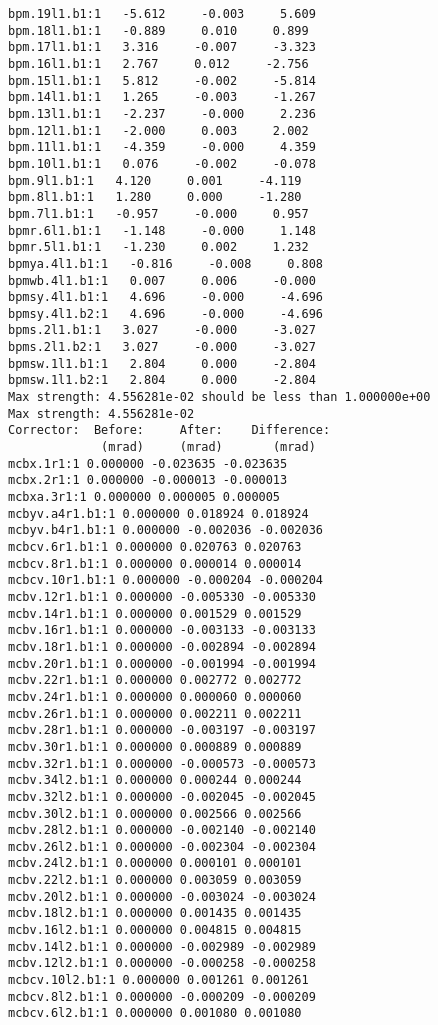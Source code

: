 \begin{verbatim}
bpm.19l1.b1:1   -5.612     -0.003     5.609
bpm.18l1.b1:1   -0.889     0.010     0.899
bpm.17l1.b1:1   3.316     -0.007     -3.323
bpm.16l1.b1:1   2.767     0.012     -2.756
bpm.15l1.b1:1   5.812     -0.002     -5.814
bpm.14l1.b1:1   1.265     -0.003     -1.267
bpm.13l1.b1:1   -2.237     -0.000     2.236
bpm.12l1.b1:1   -2.000     0.003     2.002
bpm.11l1.b1:1   -4.359     -0.000     4.359
bpm.10l1.b1:1   0.076     -0.002     -0.078
bpm.9l1.b1:1   4.120     0.001     -4.119
bpm.8l1.b1:1   1.280     0.000     -1.280
bpm.7l1.b1:1   -0.957     -0.000     0.957
bpmr.6l1.b1:1   -1.148     -0.000     1.148
bpmr.5l1.b1:1   -1.230     0.002     1.232
bpmya.4l1.b1:1   -0.816     -0.008     0.808
bpmwb.4l1.b1:1   0.007     0.006     -0.000
bpmsy.4l1.b1:1   4.696     -0.000     -4.696
bpmsy.4l1.b2:1   4.696     -0.000     -4.696
bpms.2l1.b1:1   3.027     -0.000     -3.027
bpms.2l1.b2:1   3.027     -0.000     -3.027
bpmsw.1l1.b1:1   2.804     0.000     -2.804
bpmsw.1l1.b2:1   2.804     0.000     -2.804
Max strength: 4.556281e-02 should be less than 1.000000e+00
Max strength: 4.556281e-02
Corrector:  Before:     After:    Difference:
             (mrad)     (mrad)       (mrad)  
mcbx.1r1:1 0.000000 -0.023635 -0.023635
mcbx.2r1:1 0.000000 -0.000013 -0.000013
mcbxa.3r1:1 0.000000 0.000005 0.000005
mcbyv.a4r1.b1:1 0.000000 0.018924 0.018924
mcbyv.b4r1.b1:1 0.000000 -0.002036 -0.002036
mcbcv.6r1.b1:1 0.000000 0.020763 0.020763
mcbcv.8r1.b1:1 0.000000 0.000014 0.000014
mcbcv.10r1.b1:1 0.000000 -0.000204 -0.000204
mcbv.12r1.b1:1 0.000000 -0.005330 -0.005330
mcbv.14r1.b1:1 0.000000 0.001529 0.001529
mcbv.16r1.b1:1 0.000000 -0.003133 -0.003133
mcbv.18r1.b1:1 0.000000 -0.002894 -0.002894
mcbv.20r1.b1:1 0.000000 -0.001994 -0.001994
mcbv.22r1.b1:1 0.000000 0.002772 0.002772
mcbv.24r1.b1:1 0.000000 0.000060 0.000060
mcbv.26r1.b1:1 0.000000 0.002211 0.002211
mcbv.28r1.b1:1 0.000000 -0.003197 -0.003197
mcbv.30r1.b1:1 0.000000 0.000889 0.000889
mcbv.32r1.b1:1 0.000000 -0.000573 -0.000573
mcbv.34l2.b1:1 0.000000 0.000244 0.000244
mcbv.32l2.b1:1 0.000000 -0.002045 -0.002045
mcbv.30l2.b1:1 0.000000 0.002566 0.002566
mcbv.28l2.b1:1 0.000000 -0.002140 -0.002140
mcbv.26l2.b1:1 0.000000 -0.002304 -0.002304
mcbv.24l2.b1:1 0.000000 0.000101 0.000101
mcbv.22l2.b1:1 0.000000 0.003059 0.003059
mcbv.20l2.b1:1 0.000000 -0.003024 -0.003024
mcbv.18l2.b1:1 0.000000 0.001435 0.001435
mcbv.16l2.b1:1 0.000000 0.004815 0.004815
mcbv.14l2.b1:1 0.000000 -0.002989 -0.002989
mcbv.12l2.b1:1 0.000000 -0.000258 -0.000258
mcbcv.10l2.b1:1 0.000000 0.001261 0.001261
mcbcv.8l2.b1:1 0.000000 -0.000209 -0.000209
mcbcv.6l2.b1:1 0.000000 0.001080 0.001080

\end{verbatim}
